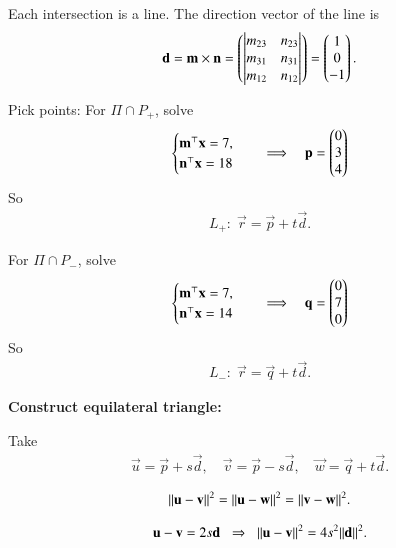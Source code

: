 \documentclass[journal]{IEEEtran}
\begin{document}
Each intersection is a line.  
The direction vector of the line is
\begin{align}
\mathbf{d} = \mathbf{m}\times \mathbf{n} =
\begin{pmatrix}
\begin{vmatrix}m_{23} & n_{23}\end{vmatrix} \\
 \begin{vmatrix}m_{31} & n_{31}\end{vmatrix} \\
\begin{vmatrix}m_{12} & n_{12}\end{vmatrix}
\end{pmatrix}
=
\begin{pmatrix}1\\0\\-1\end{pmatrix}.
\end{align}

Pick points:  
For $\Pi\cap P_+$, solve
\begin{align}
\begin{cases}
\mathbf{m}^\top \mathbf{x} = 7,\\
\mathbf{n}^\top \mathbf{x} = 18
\end{cases}
\quad\Longrightarrow\quad  \mathbf{p} = \begin{pmatrix}0\\3\\4\end{pmatrix}
\end{align}
So
\begin{align}
L_+:\; \vec{r}=\vec{p} + t\vec{d}.
\end{align}

For $\Pi\cap P_-$, solve
\begin{align}
\begin{cases}
\mathbf{m}^\top \mathbf{x}= 7,\\
\mathbf{n}^\top \mathbf{x}= 14
\end{cases}
\quad\Longrightarrow\quad  \mathbf{q} = \begin{pmatrix}0\\7\\0\end{pmatrix}
\end{align}
So
\begin{align}
L_-:\; \vec{r}=\vec{q} +t\vec{d}.
\end{align}

\textbf{Construct equilateral triangle:}

Take
\begin{align}
\vec{u}=\vec{p}+s\vec{d},\quad \vec{v}=\vec{p}-s\vec{d},\quad \vec{w}=\vec{q}+t\vec{d}.
\end{align}

\begin{align}
{\left\lVert\mathbf{u}-\mathbf{v}\right\rVert}^2={\left\lVert\mathbf{u}-\mathbf{w}\right\rVert}^2={\left\lVert\mathbf{v}-\mathbf{w}\right\rVert}^2.
\end{align}

\begin{align}
\mathbf{u}-\mathbf{v}=2s\mathbf{d} \;\;\Rightarrow\;\; {\left\lVert\mathbf{u}-\mathbf{v}\right\rVert}^2=4s^2{\left\lVert\mathbf{d}\right\rVert}^2.
\end{align}
\end{document}

